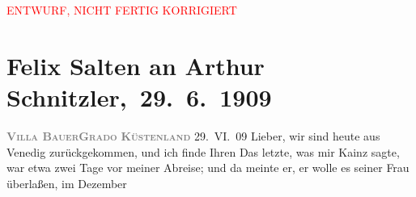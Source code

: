 
\begin{center}
            \textcolor{red}{ENTWURF, NICHT FERTIG KORRIGIERT}
                      \end{center}
            
         
         \renewcommand{\erwaehntePersonen}{Personen: Josef Kainz, Margarethe Kainz, Anna Katharina Rehmann, Felix Salten, Paul Salten, Olga Schnitzler, Heinrich Schnitzler}
         \renewcommand{\erwaehnteInstitutionen}{Institutionen: Burgtheater}
         \renewcommand{\erwaehnteOrte}{Orte: Grado, Lido, Venedig, Villa Bauer, Wien}
         \renewcommand{\erwaehnteWerke}{Werke: Der neue Vertrag Josef Kainz’, Neue Freie Presse}
               \section[ Felix Salten an Arthur Schnitzler, 29. 6. 1909]{ Felix Salten an Arthur Schnitzler, 29. 6. 1909}\nopagebreak{}\rehead{ }\begin{ledgroupsized}[t]{13cm}\normalsize\beginnumbering \toendnotes[C]{\smallbreak\pagebreak[2]} 
\toendnotes[C]{\smallbreak}\pstart
           \noindent{}{\pb}\textcolor{gray}{\textbf{\textsc{Villa Bauer}}}\hfill \textcolor{gray}{\textbf{\textsc{Grado}}}\pend
           \pstart
           \raggedleft{}\textcolor{gray}{\textbf{\textsc{Küstenland}}}\pend
           \pstart
           \raggedleft{}29. VI. 09\pend
           \pstart{}Lieber,\pend\pstart
           wir sind heute aus Venedig zurückgekommen, und ich finde Ihren \label{K_L03501-1v}\label{K_L03501-1h} Das letzte, was
               mir Kainz sagte, war etwa zwei Tage vor meiner
               Abreise; und da meinte er, er wolle es seiner Frau überlaßen, im Dezember

\end{ledgroupsized}
